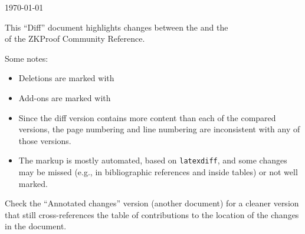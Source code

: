 \setcounter{page}{-1}

\vspace{5.3em}
\begingroup\nolinenumbers\centering
{}

\scalebox{1.25}{of the ZKProof Community Reference version 0.2}


\vspace{1em}
\today

\vspace{2em}
This ``Diff'' document highlights changes between the 
and the 
\\
of the ZKProof Community Reference.


\raggedright
\vspace{2em}
Some notes:
\vspace{.5em}\begin{itemize}\setlength{\itemsep}{.5em}
\item Deletions are marked with 
\item Add-ons are marked with 
\item Since the diff version contains more content than each of the compared versions, 
the page numbering and line numbering are inconsistent with any of those versions.
\item The markup is mostly automated, based on {\tt latexdiff}, 
and some changes may be missed (e.g., in bibliographic references and inside tables) 
or not well marked.
\end{itemize}

\vspace{2em}
Check the ``Annotated changes'' version (another document) for a cleaner version that still 
cross-references the table of contributions to the location of the changes in the document.


\vfill
\renewcommand\cftloctitlefont{\bfseries\LARGE}
\listofcontribution

\endgroup
\thispagestyle{empty}

\clearpage\null\thispagestyle{intentionallyblank}\clearpage
